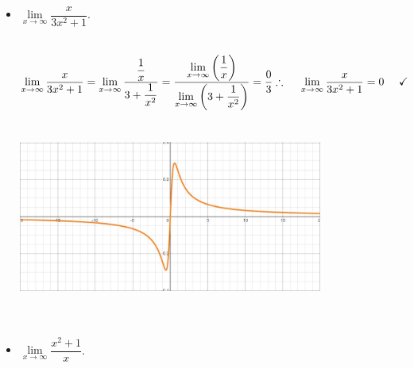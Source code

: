 \documentclass[fleqn]{article}
\begin{document}
\begin{enumerate}
\begin{itemize}
      \item $\lim\limits_{x \to \infty} \dfrac{x}{3x^2+1}$. 

        \textcolor{hwColor}{
          \\
          $
            \lim\limits_{x \to \infty} \dfrac{x}{3x^2+1}
            =\lim\limits_{x \to \infty} \dfrac{\dfrac{1}{x}}{3+\dfrac{1}{x^2}}
            =\dfrac{\lim\limits_{x \to \infty} \left(\dfrac{1}{x}\right)}{\lim\limits_{x \to \infty} \left(3+\dfrac{1}{x^2}\right)}
            =\dfrac{0}{3}
            \\
            \\
            \\
            \therefore ~~~~ \lim\limits_{x \to \infty} \dfrac{x}{3x^2+1}=0 ~~~~ \checkmark
            \\
          $
          \\
          \\
          \includegraphics[width=10cm, height=6cm]{Two.JPG}
          \\
          \\
        }

      \item $\lim\limits_{x \to \infty} \dfrac{x^2+1}{x}$. 


\end{itemize}
\end{enumerate}
\end{document}
